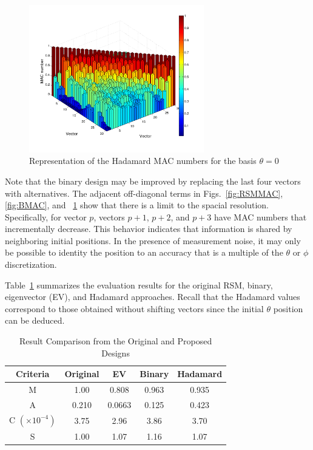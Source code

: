 \documentclass[3p,times]{elsarticle}
\begin{document}
\begin{figure}[ht!]
\includegraphics[width={3.0in}]{../figs/HadMAC.pdf}
\centering
\caption{Representation of the Hadamard MAC numbers for the basis $\theta=0$}
\label{fig:HadMAC}
\end{figure}
Note that the binary design may be 
improved by replacing the last four vectors with alternatives.  The adjacent off-diagonal terms in Figs.~\ref{fig:RSMMAC}, \ref{fig:BMAC}, and ~\ref{fig:HadMAC} show that there is a limit to the
spacial resolution.  Specifically, for vector $p$, vectors $p+1$, $p+2$, and $p+3$ have MAC numbers that incrementally decrease.  This behavior indicates that information is shared by neighboring initial
positions.  In the presence of measurement noise, it may only be possible to identity the position to an accuracy that is a multiple of the $\theta$ or $\phi$ discretization.

Table~\ref{table:results} summarizes the evaluation results for the original RSM, binary, eigenvector (EV), and Hadamard approaches.  Recall that the Hadamard values correspond to those
obtained without shifting vectors since the initial $\theta$ position can be deduced.
\begin{table}[ht]
\caption{Result Comparison from the Original and Proposed Designs} %
\centering %
\begin{tabular}{|c|c|c|c|c|} %
\hline
Criteria & Original & EV & Binary & Hadamard\\
\hline
M & 1.00 & 0.808 & 0.963 & 0.935\\
\hline
A & 0.210 & 0.0663 & 0.125 & 0.423 \\
\hline
C $\left(\times 10^{-4}\right)$ & 3.75 & 2.96 & 3.86 & 3.70\\
\hline
S & 1.00 & 1.07 & 1.16 & 1.07 \\
\hline
\end{tabular}
\label{table:results} %
\end{table}
\end{document}
